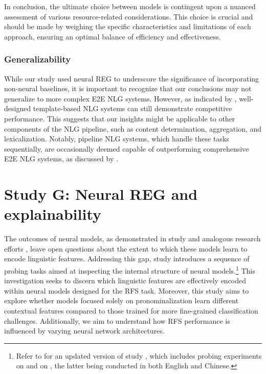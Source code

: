 In conclusion, the ultimate choice between models is contingent upon a nuanced assessment of various resource-related considerations. This choice is crucial and should be made by weighing the specific characteristics and limitations of each approach, ensuring an optimal balance of efficiency and effectiveness.

\subsubsection{Generalizability}
While our study used neural REG to underscore the significance of incorporating non-neural baselines, it is important to recognize that our conclusions may not generalize to more complex E2E NLG systems. However, as indicated by \citet{dusek-etal-2018-findings}, well-designed template-based NLG systems can still demonstrate competitive performance. This suggests that our insights might be applicable to other components of the NLG pipeline, such as content determination, aggregation, and lexicalization. Notably, pipeline NLG systems, which handle these tasks sequentially, are occasionally deemed capable of outperforming comprehensive E2E NLG systems, as discussed by \citet{castro-ferreira-etal-2019-neural}.

\section{Study G: Neural REG and explainability}\label{sec:probingexplainability}

The outcomes of neural models, as demonstrated in study \studF and analogous research efforts \citep{ferreira2018neuralreg, cao2019referring, cunha-etal-2020-referring}, leave open questions about the extent to which these models learn to encode linguistic features. Addressing this gap, study \studG introduces a sequence of probing tasks aimed at inspecting the internal structure of neural models.\footnote{Refer to \citet{chen-etal-2023-probing} for an updated version of study \studG, which includes probing experiments on \webnlg and on \wsj, the latter being conducted in both English and Chinese.} This investigation seeks to discern which linguistic features are effectively encoded within neural models designed for the RFS task. Moreover, this study aims to explore whether models focused solely on pronominalization learn different contextual features compared to those trained for more fine-grained classification challenges. Additionally, we aim to understand how RFS performance is influenced by varying neural network architectures.

